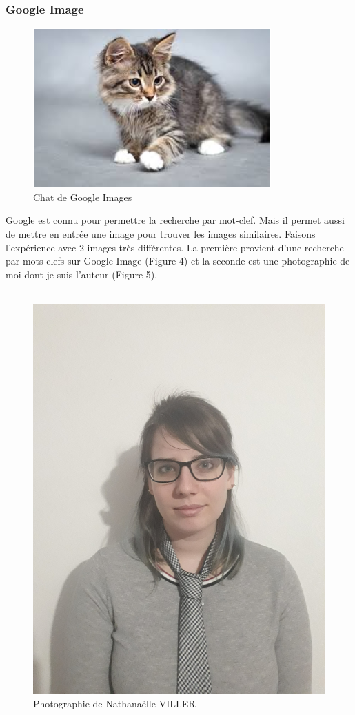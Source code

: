 \documentclass[a4paper,12pt]{article}
\begin{document}
\subsubsection{Google Image}
 \begin{figure}[!ht]
    \centering
        \includegraphics[scale=0.7]{images/telechargement.PNG}
        \caption{Chat de Google Images}
    \end{figure}
Google est connu pour permettre la recherche par mot-clef. Mais il permet aussi de mettre en entrée une image pour trouver les images similaires. Faisons l'expérience avec 2 images très différentes. La première provient d'une recherche par mots-clefs sur Google Image (Figure 4) et la seconde est une photographie de moi dont je suis l'auteur (Figure 5). \\ \\
   \begin{figure}[!ht]
    \centering
        \includegraphics[scale=0.04]{images/27785203_330504664108478_1945544054_o.jpg}
        \caption{Photographie de Nathanaëlle VILLER}
    \end{figure}
\end{document}
